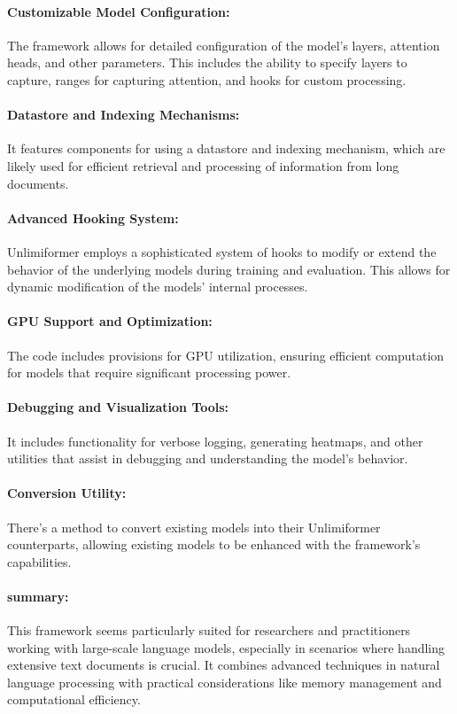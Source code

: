 \documentclass[12pt]{article}
\begin{document}
\paragraph{Customizable Model Configuration:} The framework allows for detailed
configuration of the model's layers, attention heads, and other parameters.
This includes the ability to specify layers to capture, ranges for capturing
attention, and hooks for custom processing.

\paragraph{Datastore and Indexing Mechanisms:} It features components for using
a datastore and indexing mechanism, which are likely used for efficient
retrieval and processing of information from long documents.

\paragraph{Advanced Hooking System:} Unlimiformer employs a sophisticated
system of hooks to modify or extend the behavior of the underlying models
during training and evaluation. This allows for dynamic modification of the
models' internal processes.

\paragraph{GPU Support and Optimization:} The code includes provisions for GPU
utilization, ensuring efficient computation for models that require significant
processing power.

\paragraph{Debugging and Visualization Tools:} It includes functionality for
verbose logging, generating heatmaps, and other utilities that assist in
debugging and understanding the model's behavior.

\paragraph{Conversion Utility:} There's a method to convert existing models
into their Unlimiformer counterparts, allowing existing models to be enhanced
with the framework's capabilities.

\paragraph{summary:} This framework seems particularly suited for researchers
and practitioners working with large-scale language models, especially in
scenarios where handling extensive text documents is crucial. It combines
advanced techniques in natural language processing with practical
considerations like memory management and computational efficiency.
\end{document}

